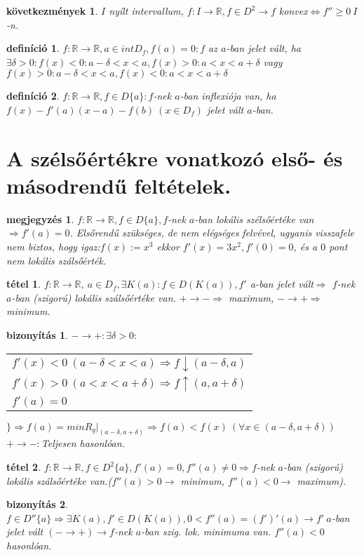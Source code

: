 \documentclass{article}
\newcommand{\fir}{f\colon I\rightarrow\mathbb{R}}
\newcommand{\ek}{\Longleftrightarrow}
\newcommand{\R}{\mathbb{R}}
\newcommand{\n}{\rightarrow}
\newcommand{\nn}{\Rightarrow}
\newcommand{\sarrow}{\downarrow}
\newcommand{\narrow}{\uparrow}
\theoremstyle{magyar}
\newtheorem{de}{definíció}[section]
\newtheorem{te}{tétel}[section]
\newtheorem{bi}{bizonyítás}[section]
\newtheorem{ko}{következmények}[section]
\newtheorem{me}{megjegyzés}[section]
\begin{document}
  \begin{ko}
    $I$ nyílt intervallum, $\fir, f\in D^2\n f$ konvex$\ek f''\ge 0\ I$-n.
  \end{ko}
  \begin{de}
    $f:\R\n\R,a\in intD_f, f(a)=0: f$ az $a$-ban jelet vált, ha $\exists\delta>0: f(x)<0:a-\delta<x<a, f(x)>0:a<x<a+\delta$ vagy $f(x)>0:a-\delta<x<a, f(x)<0:a<x<a+\delta$
  \end{de}
  \begin{de}
    $f:\R\n\R,f\in D\{a\}: f$-nek $a$-ban inflexiója van, ha $f(x)-f'(a)(x-a)-f(b)\ (x\in D_f)$ jelet vált $a$-ban.
  \end{de}
  \newpage
  \section{A szélsőértékre vonatkozó első- és másodrendű feltételek.}
  \begin{me}
    $f:\R\n\R, f\in D\{a\}, f$-nek $a$-ban lokális szélsőértéke van$\nn f'(a)=0$. Elsőrendű szükséges, de nem elégséges felvével, ugyanis visszafele nem biztos, hogy igaz:$f(x):=x^3$ ekkor $f'(x)=3x^2, f'(0)=0$, és a $0$ pont nem lokális szálsőérték.
  \end{me}
  \begin{te}
    $f:\R\n\R,~a\in D_f,\exists K(a): f\in D(K(a)), f'$ a-ban jelet vált$\nn$ $f$-nek $a$-ban (szigorú) lokális szálsőértéke van. $+\n-\nn$ maximum, $-\n+\nn$ minimum.
  \end{te}
  \begin{bi}
    $-\n+:\exists\delta>0:$ \\
  \begin{tabular}{l}
    $f'(x)<0\ (a-\delta<x<a)\nn f\sarrow(a-\delta,a)$\\
    $f'(x)>0\ (a<x<a+\delta)\nn f\narrow(a,a+\delta)$\\
    $f'(a)=0$\end{tabular}$\bigg\}\nn f(a)=minR_g|_{(a-\delta,a+\delta)}\nn f(a)<f(x)\ (\forall x\in(a-\delta,a+\delta))$
  $+\n-:$Teljesen hasonlóan.
  \end{bi}
  \begin{te}
    $f:\R\n\R,f\in D^2\{a\}, f'(a)=0, f''(a)\not=0\nn f$-nek $a$-ban (szigorú) lokális szálsőértéke van.($f''(a)>0\n$ minimum, $f''(a)<0\n$ maximum).
  \end{te}
  \begin{bi}
    $f\in D''\{a\}\nn\exists K(a), f'\in D(K(a)), 0<f''(a)=(f')'(a)\n f'\ a$-ban jelet vált $(-\n+)\n f$-nek $a$-ban szig. lok. minimuma van. $f''(a)<0$ hasonlóan.
  \end{bi}
\end{document}
